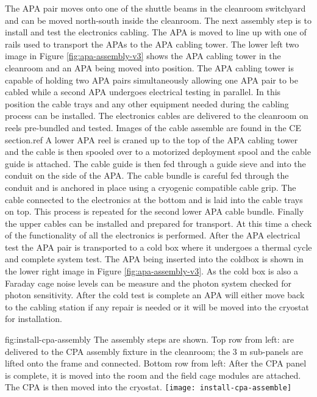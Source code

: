 The APA pair moves onto one of the shuttle beams in the cleanroom switchyard and can be moved north-south inside the cleanroom. The next assembly step is to install and test the electronics cabling. The APA is moved to line up with one of rails used to transport the APAs to the APA cabling tower. The lower left two image in Figure \ref{fig:apa-assembly-v3} shows the APA cabling tower in the cleanroom and an APA being moved into position. The APA cabling tower is capable of holding two APA pairs simultaneously allowing one APA pair to be cabled while a second APA undergoes electrical testing in parallel. In this position the cable trays and any other equipment needed during the cabling process can be installed. The electronics cables are delivered to the cleanroom on reels pre-bundled and tested. Images of the cable assemble are found in the CE section.ref{} A lower APA reel is craned up to the top of the APA cabling tower and the cable is then spooled over to a motorized deployment spool and the cable guide is attached.  The cable guide is then fed through a guide sieve and into the conduit on the side of the APA. The cable bundle is careful fed through the conduit and is anchored in place using a cryogenic compatible cable grip. The cable connected to the electronics at the bottom and is laid into the cable trays on top. This process is repeated for the second lower APA cable bundle. Finally the upper cables can be installed and prepared for transport. At this time a check of the functionality of all the electronics is performed. After the APA electrical test the APA pair is transported to a cold box where it undergoes a thermal cycle and complete system test. The APA being inserted into the coldbox is shown in the lower right image in Figure \ref{fig:apa-assembly-v3}. As the cold box is also a Faraday cage noise levels can be measure and the photon system checked for photon sensitivity. After the cold test is complete an APA will either move back to the cabling station if any repair is needed or it will be moved into the cryostat for installation. 



\begin{dunefigure}{fig:install-cpa-assembly}
  {The  assembly steps are shown. Top row from left:   are delivered to the CPA assembly fixture in the cleanroom; the 3 \si{m} sub-panels are lifted onto the frame and connected. Bottom row from left: After the CPA panel is complete, it is moved into the room and the field cage modules are attached. The CPA is then moved into the cryostat.}
\texttt{[image: install-cpa-assemble]}
\end{dunefigure}

